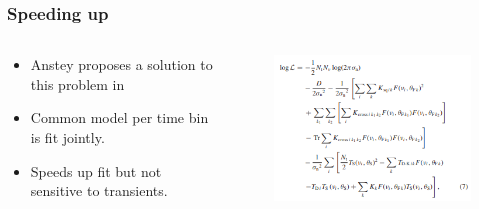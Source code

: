 \documentclass[aspectratio=169]{beamer}
\begin{document}
  \begin{frame}
  \frametitle{Speeding up}

  \begin{columns}[T]

      \begin{column}{0.5\textwidth}
          \begin{itemize}
              \item Anstey proposes a solution to this problem in~\cite{anstey2023use}
              \item Common model per time bin is fit jointly.
              \item Speeds up fit but not sensitive to transients.
          \end{itemize}
      \end{column}

      \begin{column}{0.5\textwidth}
          \begin{figure}
              \includegraphics[width=\textwidth]{images/dom_timedep_math.png}
            \end{figure}
      \end{column}

    \end{columns}

    \end{frame}
\end{document}
